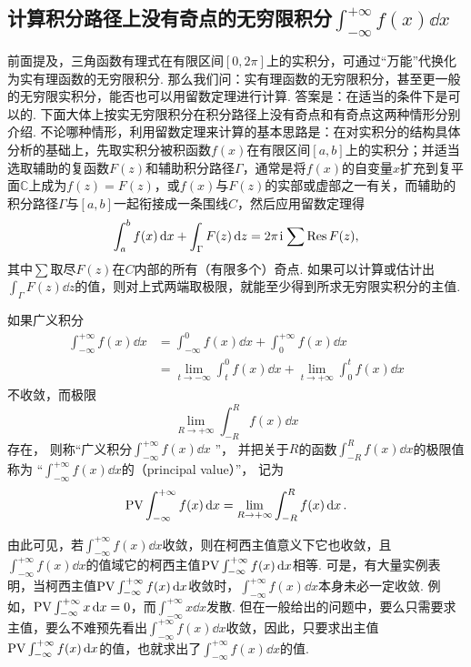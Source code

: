 \subsection{计算积分路径上没有奇点的无穷限积分\texorpdfstring{\(\int_{-\infty}^{+\infty} f(x) \dd{x}\)}{}}
前面提及，三角函数有理式在有限区间\([0,2\pi]\)上的实积分，可通过“万能”代换化为实有理函数的无穷限积分.
那么我们问：实有理函数的无穷限积分，甚至更一般的无穷限实积分，能否也可以用留数定理进行计算.
答案是：在适当的条件下是可以的.
下面大体上按实无穷限积分在积分路径上没有奇点和有奇点这两种情形分别介绍.
不论哪种情形，利用留数定理来计算的基本思路是：在对实积分的结构具体分析的基础上，先取实积分被积函数\(f(x)\)在有限区间\([a,b]\)上的实积分；并适当选取辅助的复函数\(F(z)\)和辅助积分路径\(\Gamma\)，通常是将\(f(x)\)的自变量\(x\)扩充到复平面\(\mathbb{C}\)上成为\(f(z)=F(z)\)，或\(f(x)\)与\(F(z)\)的实部或虚部之一有关，而辅助的积分路径\(\Gamma\)与\([a,b]\)一起衔接成一条围线\(C\)，然后应用留数定理得\begin{equation}
\int_a^b f(x) \dd{x}
+ \int_{\Gamma} F(z) \dd{z}
= 2\pi\kern1pt\mathrm{i}\kern1pt \sum \operatorname{Res} F(z),
\end{equation}
其中\(\sum\)取尽\(F(z)\)在\(C\)内部的所有（有限多个）奇点.
如果可以计算或估计出\(\int_{\Gamma} F(z) \dd{z}\)的值，则对上式两端取极限，就能至少得到所求无穷限实积分的主值.

如果广义积分\begin{align*}
\int_{-\infty}^{+\infty} f(x) \dd{x}
&= \int_{-\infty}^0 f(x) \dd{x} + \int_0^{+\infty} f(x) \dd{x} \\
&= \lim\limits_{t \to -\infty} \int_t^0 f(x) \dd{x}
	+ \lim\limits_{t \to +\infty} \int_0^t f(x) \dd{x}
\end{align*}
不收敛，而极限\[
\lim\limits_{R\to+\infty} \int_{-R}^R f(x) \dd{x}
\]存在，
则称“广义积分\(\int_{-\infty}^{+\infty} f(x) \dd{x}\) ”，
并把关于\(R\)的函数\(\int_{-R}^R f(x) \dd{x}\)的极限值称为%
“\(\int_{-\infty}^{+\infty} f(x) \dd{x}\)的（principal value）”，
记为\[
	{\rm PV} \int_{-\infty}^{+\infty} f(x) \dd{x}
	= \lim\limits_{R\to+\infty} \int_{-R}^R f(x) \dd{x}.
\]

由此可见，若\(\int_{-\infty}^{+\infty} f(x) \dd{x}\)收敛，则在柯西主值意义下它也收敛，且\(\int_{-\infty}^{+\infty} f(x) \dd{x}\)的值域它的柯西主值\({\rm PV} \int_{-\infty}^{+\infty} f(x) \dd{x}\)相等.
可是，有大量实例表明，当柯西主值\({\rm PV} \int_{-\infty}^{+\infty} f(x) \dd{x}\)收敛时，\(\int_{-\infty}^{+\infty} f(x) \dd{x}\)本身未必一定收敛.
例如，\({\rm PV} \int_{-\infty}^{+\infty} x \dd{x} = 0\)，而\(\int_{-\infty}^{+\infty} x \dd{x}\)发散.
但在一般给出的问题中，要么只需要求主值，要么不难预先看出\(\int_{-\infty}^{+\infty} f(x) \dd{x}\)收敛，因此，只要求出主值\({\rm PV} \int_{-\infty}^{+\infty} f(x) \dd{x}\)的值，也就求出了\(\int_{-\infty}^{+\infty} f(x) \dd{x}\)的值.

